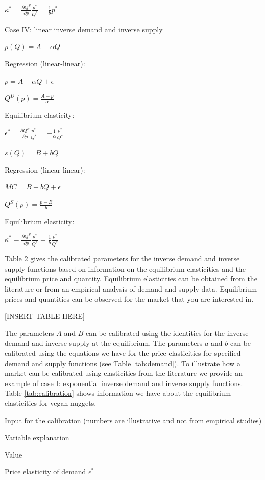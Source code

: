 \documentclass[
]{book}
\begin{document}
\(\kappa^\ast = \frac{\partial Q^S}{\partial p}\frac{p^\ast}{Q^\ast} = \frac{1}{b}p^\ast\)

Case IV: linear inverse demand and inverse supply

\(p(Q)=A- \alpha Q\)

Regression (linear-linear):

\(p=A-\alpha Q+ \epsilon\)

\(Q^D (p)=\frac{A-p}{\alpha}\)

Equilibrium elasticity:

\(\epsilon^\ast=\frac{\partial Q^\alpha}{\partial p}\frac{p^\ast}{Q^\ast}=-\frac{1}{\alpha}\frac{p^\ast}{Q^\ast}\)

\(s(Q)=B+bQ\)

Regression (linear-linear):

\(MC=B+bQ+\epsilon\)

\(Q^S(p)=\frac{p-B}{b}\)

Equilibrium elasticity:

\(\kappa^\ast = \frac{\partial Q^S}{\partial p}\frac{p^\ast}{Q^\ast} = \frac{1}{b}\frac{p^\ast}{Q^\ast}\)

Table 2 gives the calibrated parameters for the inverse demand and inverse supply functions based on information on the equilibrium elasticities and the equilibrium price and quantity. Equilibrium elasticities can be obtained from the literature or from an empirical analysis of demand and supply data. Equilibrium prices and quantities can be observed for the market that you are interested in.

{[}INSERT TABLE HERE{]}

The parameters \(A\) and \(B\) can be calibrated using the identities for the inverse demand and inverse supply at the equilibrium. The parameters \(a\) and \(b\) can be calibrated using the equations we have for the price elasticities for specified demand and supply functions (see Table \ref{tab:demand}).
To illustrate how a market can be calibrated using elasticities from the literature we provide an example of case I: exponential inverse demand and inverse supply functions. Table \ref{tab:calibration} shows information we have about the equilibrium elasticities for vegan nuggets.

\label{tab:calibration}Input for the calibration (numbers are illustrative and not from empirical studies)

Variable explanation

Value

Price elasticity of demand \(\epsilon^\ast\)
\end{document}
